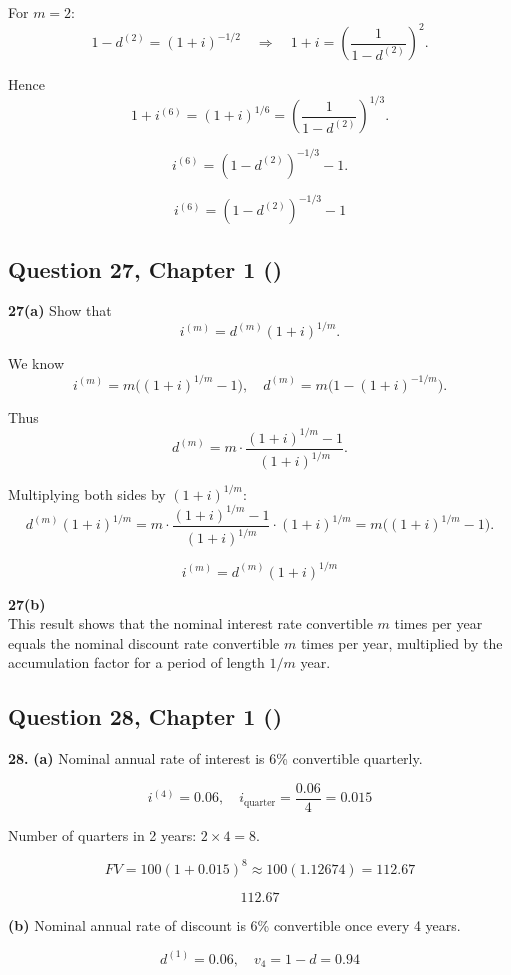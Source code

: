 \documentclass[12pt, a4paper]{article}
\begin{document}
For \(m=2\):
\[
1-d^{(2)} = (1+i)^{-1/2} \quad \Rightarrow \quad 1+i = \left(\frac{1}{1-d^{(2)}}\right)^2.
\]

Hence
\[
1+i^{(6)} = (1+i)^{1/6} = \left(\frac{1}{1-d^{(2)}}\right)^{1/3}.
\]

\[
i^{(6)} = (1-d^{(2)})^{-1/3} - 1.
\]

\[
\boxed{i^{(6)} = (1-d^{(2)})^{-1/3} - 1}
\]

\subsection*{Question 27, Chapter 1  (\cite{toi3rd})}

\textbf{27(a)} Show that
\[
i^{(m)} = d^{(m)} (1+i)^{1/m}.
\]

We know
\[
i^{(m)} = m \big( (1+i)^{1/m} - 1 \big),
\quad 
d^{(m)} = m \big( 1 - (1+i)^{-1/m} \big).
\]

Thus
\[
d^{(m)} = m \cdot \frac{(1+i)^{1/m} - 1}{(1+i)^{1/m}}.
\]

Multiplying both sides by \((1+i)^{1/m}\):
\[
d^{(m)} (1+i)^{1/m} 
= m \cdot \frac{(1+i)^{1/m} - 1}{(1+i)^{1/m}} \cdot (1+i)^{1/m}
= m \big( (1+i)^{1/m} - 1 \big).
\]

\[
\boxed{i^{(m)} = d^{(m)} (1+i)^{1/m}}
\]

\bigskip
\textbf{27(b)} \\
This result shows that the nominal interest rate convertible \(m\) times per year
equals the nominal discount rate convertible \(m\) times per year,
multiplied by the accumulation factor for a period of length \(1/m\) year.

\subsection*{Question 28, Chapter 1  (\cite{toi3rd})}

\textbf{28.}
\textbf{(a)} Nominal annual rate of interest is 6\% convertible quarterly.  

\[
i^{(4)} = 0.06, 
\quad i_{\text{quarter}} = \frac{0.06}{4} = 0.015
\]

Number of quarters in 2 years: \( 2 \times 4 = 8 \).  

\[
FV = 100(1+0.015)^8 \approx 100(1.12674) = 112.67
\]

\[
\boxed{112.67}
\]

\bigskip
\textbf{(b)} Nominal annual rate of discount is 6\% convertible once every 4 years.  

\[
d^{(1)} = 0.06, 
\quad v_4 = 1-d = 0.94
\]
\end{document}
